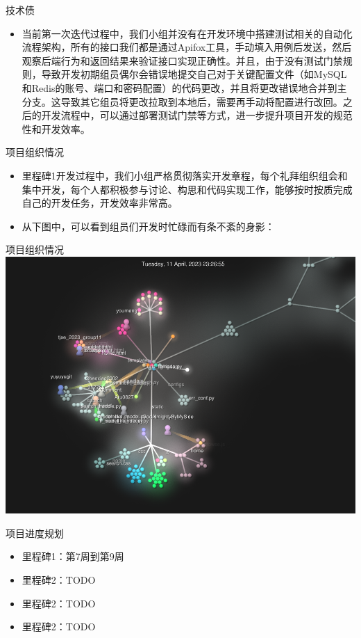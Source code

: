 \begin{frame}{技术债}
    \begin{itemize}
        \item 当前第一次迭代过程中，我们小组并没有在开发环境中搭建测试相关的自动化流程架构，所有的接口我们都是通过Apifox工具，手动填入用例后发送，然后观察后端行为和返回结果来验证接口实现正确性。并且，由于没有测试门禁规则，导致开发初期组员偶尔会错误地提交自己对于关键配置文件（如MySQL和Redis的账号、端口和密码配置）的代码更改，并且将更改错误地合并到主分支。这导致其它组员将更改拉取到本地后，需要再手动将配置进行改回。之后的开发流程中，可以通过部署测试门禁等方式，进一步提升项目开发的规范性和开发效率。
    \end{itemize}
\end{frame}

\begin{frame}{项目组织情况}
    \begin{itemize}
        \item 里程碑1开发过程中，我们小组严格贯彻落实开发章程，每个礼拜组织组会和集中开发，每个人都积极参与讨论、构思和代码实现工作，能够按时按质完成自己的开发任务，开发效率非常高。
        \item 从下图中，可以看到组员们开发时忙碌而有条不紊的身影：
    \end{itemize}
\end{frame}

\begin{frame}{项目组织情况}
    \includegraphics[width=1\textwidth]{contents/figure/commits.png}
\end{frame}

\begin{frame}{项目进度规划}
    \begin{itemize}
        \item 里程碑1：第7周到第9周
        \item 里程碑2：TODO
        \item 里程碑2：TODO
        \item 里程碑2：TODO
    \end{itemize}
\end{frame}